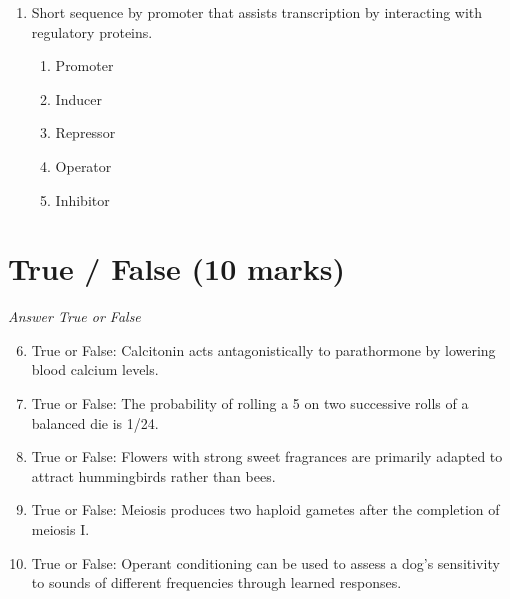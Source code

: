 \documentclass[12pt]{article}
\begin{document}
\begin{enumerate}[label=\arabic*.]
\begin{enumerate}[label=(\alph*)]
    \item Smaller cells are more resilient to external damage.
    \item Smaller cells have a larger number of organelles.
    \item Smaller cells require less energy to function.
    \item Smaller cells can multiply faster.
    \item Smaller cells fit together more tightly.
\end{enumerate}
\item Short sequence by promoter that assists transcription by interacting with regulatory proteins.
\begin{enumerate}[label=(\alph*)]
    \item Promoter
    \item Inducer
    \item Repressor
    \item Operator
    \item Inhibitor
\end{enumerate}
\end{enumerate}

\section*{True / False (10 marks)}
\textit{Answer True or False}
\begin{enumerate}[label=\arabic*.]
\setcounter{enumi}{5}
\item True or False: Calcitonin acts antagonistically to parathormone by lowering blood calcium levels.
\item True or False: The probability of rolling a 5 on two successive rolls of a balanced die is 1/24.
\item True or False: Flowers with strong sweet fragrances are primarily adapted to attract hummingbirds rather than bees.
\item True or False: Meiosis produces two haploid gametes after the completion of meiosis I.
\item True or False: Operant conditioning can be used to assess a dog's sensitivity to sounds of different frequencies through learned responses.
\end{enumerate}
\end{document}
